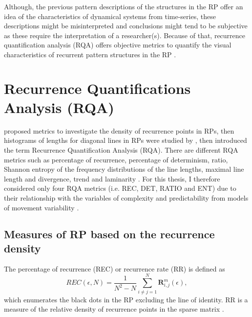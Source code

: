 Although, the previous pattern descriptions of the structures in the 
RP offer an idea of the characteristics of dynamical systems from 
time-series, these descriptions might be misinterpreted and conclusions might 
tend to be subjective as these require the interpretation of a researcher(s).
Because of that, recurrence quantification analysis (RQA) offers objective
metrics to quantify the visual characteristics of recurrent 
pattern structures in the RP \citep{zbilut1992}.

\section{Recurrence Quantifications Analysis (RQA)} \label{sec:rqa}
\cite{zbilut1992} proposed metrics to investigate the density of recurrence 
points in RPs, then histograms of lengths for diagonal lines in RPs were 
studied by \cite{trulla1996}, then \cite{marwan2008} introduced the term 
Recurrence Quantification Analysis (RQA). 
There are different RQA metrics such as percentage of recurrence, 
percentage of determinism, ratio, Shannon entropy of the 
frequency distributions of the line lengths, maximal line length and 
divergence, trend and laminarity \citep{marwan2007, marwan2015}.
For this thesis, I therefore considered only four RQA metrics 
(i.e. REC, DET, RATIO and ENT) due to their relationship with the 
variables of complexity and predictability from models of movement 
variability \citep{stergiou2006, vaillancourt2002, vaillancourt2003}.

\subsection{Measures of RP based on the recurrence density}
The percentage of recurrence (REC) or recurrence rate (RR) is defined as
\begin{equation}
	REC(\epsilon,N)= 
	\frac{1}{N^2 - N} \sum^{N}_{i \neq j = 1} 
	\mathbf{R}^{m}_{i,j}(\epsilon),
\end{equation}
which enumerates the black dots in the RP excluding the line of identity.
RR is a measure of the relative density of recurrence points in the sparse 
matrix \citep{marwan2015}.

